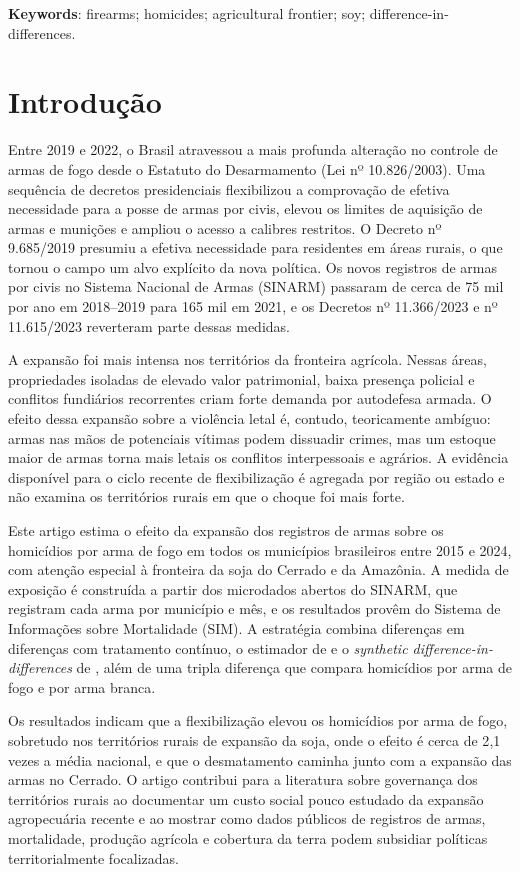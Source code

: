 \documentclass[12pt,a4paper]{article}
\begin{document}
\noindent\textbf{Keywords}: firearms; homicides; agricultural frontier; soy; difference-in-differences.

\section{Introdução}

Entre 2019 e 2022, o Brasil atravessou a mais profunda alteração no controle de armas de fogo desde o Estatuto do Desarmamento (Lei nº 10.826/2003). Uma sequência de decretos presidenciais flexibilizou a comprovação de efetiva necessidade para a posse de armas por civis, elevou os limites de aquisição de armas e munições e ampliou o acesso a calibres restritos. O Decreto nº 9.685/2019 presumiu a efetiva necessidade para residentes em áreas rurais, o que tornou o campo um alvo explícito da nova política. Os novos registros de armas por civis no Sistema Nacional de Armas (SINARM) passaram de cerca de 75 mil por ano em 2018--2019 para 165 mil em 2021, e os Decretos nº 11.366/2023 e nº 11.615/2023 reverteram parte dessas medidas.

A expansão foi mais intensa nos territórios da fronteira agrícola. Nessas áreas, propriedades isoladas de elevado valor patrimonial, baixa presença policial e conflitos fundiários recorrentes criam forte demanda por autodefesa armada. O efeito dessa expansão sobre a violência letal é, contudo, teoricamente ambíguo: armas nas mãos de potenciais vítimas podem dissuadir crimes, mas um estoque maior de armas torna mais letais os conflitos interpessoais e agrários. A evidência disponível para o ciclo recente de flexibilização é agregada por região ou estado \citep{baculi2021,wakim2025} e não examina os territórios rurais em que o choque foi mais forte.

Este artigo estima o efeito da expansão dos registros de armas sobre os homicídios por arma de fogo em todos os municípios brasileiros entre 2015 e 2024, com atenção especial à fronteira da soja do Cerrado e da Amazônia. A medida de exposição é construída a partir dos microdados abertos do SINARM, que registram cada arma por município e mês, e os resultados provêm do Sistema de Informações sobre Mortalidade (SIM). A estratégia combina diferenças em diferenças com tratamento contínuo, o estimador de \citet{callaway2021} e o \textit{synthetic difference-in-differences} de \citet{arkhangelsky2021}, além de uma tripla diferença que compara homicídios por arma de fogo e por arma branca.

Os resultados indicam que a flexibilização elevou os homicídios por arma de fogo, sobretudo nos territórios rurais de expansão da soja, onde o efeito é cerca de 2{,}1 vezes a média nacional, e que o desmatamento caminha junto com a expansão das armas no Cerrado. O artigo contribui para a literatura sobre governança dos territórios rurais ao documentar um custo social pouco estudado da expansão agropecuária recente e ao mostrar como dados públicos de registros de armas, mortalidade, produção agrícola e cobertura da terra podem subsidiar políticas territorialmente focalizadas.
\end{document}
